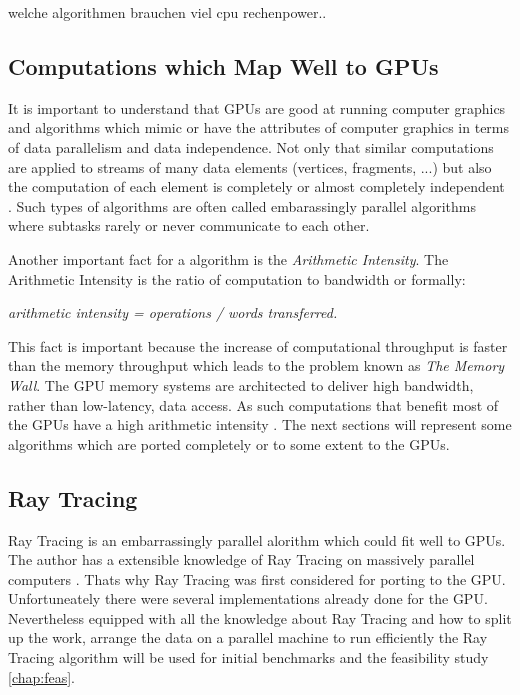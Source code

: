 {\color{red} welche algorithmen brauchen viel cpu rechenpower..}

\subsection{Computations which Map Well to GPUs} %
\label{par:computations_which_map_well_to_GPUs}
It is important to understand that \glspl{GPU} are good at running computer
graphics and algorithms which mimic or have the attributes of computer graphics
in terms of data parallelism and data independence. Not only that similar
computations are applied to streams of many data elements (vertices, fragments,
...) but also the computation of each element is completely or almost completely
independent \citep{citeulike:3733428}. Such types of algorithms are often called
embarassingly parallel algorithms where subtasks rarely or never communicate to
each other.

Another important fact for a algorithm is the \emph{Arithmetic Intensity}. The
Arithmetic Intensity is the ratio of computation to bandwidth or formally:
\begin{center} 
 \emph{arithmetic intensity = operations / words transferred.}
\end{center}
This fact is important because the increase of computational throughput is
faster than the memory throughput which leads to the problem known as \emph{The
Memory Wall}. The \gls{GPU} memory systems are architected to deliver high bandwidth,
rather than low-latency, data access. As such computations that benefit most of
the \glspl{GPU} have a high arithmetic intensity \citep{citeulike:3733428}. The next 
sections will represent some algorithms which are ported completely or to some 
extent to the \glspl{GPU}.

\subsection{Ray Tracing} %
\label{par:ray_tracing}
Ray Tracing \citep{citeulike:841961} is an embarrassingly parallel alorithm which
could fit well to \glspl{GPU}. The author has a extensible knowledge of Ray Tracing on
massively parallel computers \citep{citeulike:80546}. Thats why Ray Tracing was
first considered for porting to the GPU. Unfortuneately there were several
implementations already done for the GPU. Nevertheless equipped with all the
knowledge about Ray Tracing and how to split up the work, arrange the data on a
parallel machine to run efficiently the Ray Tracing algorithm
\citep{citeulike:3770900} will be used for initial benchmarks and the feasibility
study \autoref{chap:feas}.

